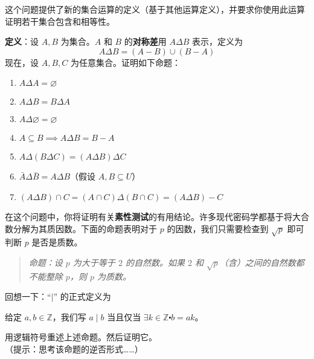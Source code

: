 \begin{exercise}
    这个问题提供了新的集合运算的定义（基于其他运算定义），并要求你使用此运算证明若干集合包含和相等性。

    \textbf{定义}：设 $A,B$ 为集合。$A$ 和 $B$ 的\textbf{对称差}用 $A \Delta B$ 表示，定义为
    \[A \Delta B = (A - B) \cup (B - A)\]
    现在，设 $A,B,C$ 为任意集合。证明如下命题：

    \begin{enumerate}[label=(\alph*)]
        \item $A \Delta A = \varnothing$
        \item $A \Delta B = B \Delta A$
        \item $A \Delta \varnothing = \varnothing$
        \item $A \subseteq B \implies A \Delta B = B - A$
        \item $A \Delta (B \Delta C) = (A \Delta B) \Delta C$
        \item $\bar{A} \Delta \bar{B} = A \Delta B$（假设 $A, B \subseteq U$）
        \item $ (A \Delta B) \cap C = (A \cap C) \Delta (B \cap C) = (A \Delta B) - C$
    \end{enumerate} 
\end{exercise}

\begin{exercise}
    在这个问题中，你将证明有关\textbf{素性测试}的有用结论。许多现代密码学都基于将大合数分解为其质因数。下面的命题表明对于 $p$ 的因数，我们只需要检查到 $\sqrt{p}$ 即可判断 $p$ 是否是质数。

    \begin{quote}
        \emph{命题：设 $p$ 为大于等于 $2$ 的自然数。如果 $2$ 和 $\sqrt{p}$（含）之间的自然数都不能整除 $p$，则 $p$ 为质数。}
    \end{quote}
    回想一下：``$\mid$'' 的正式定义为
    \begin{center}
        给定 $a, b \in \mathbb{Z}$，我们写 $a \mid b$ 当且仅当 $\exists k \in \mathbb{Z} \centerdot b = ak$。
    \end{center}
    用逻辑符号重述上述命题。然后证明它。\\
    （提示：思考该命题的逆否形式……）
\end{exercise}

